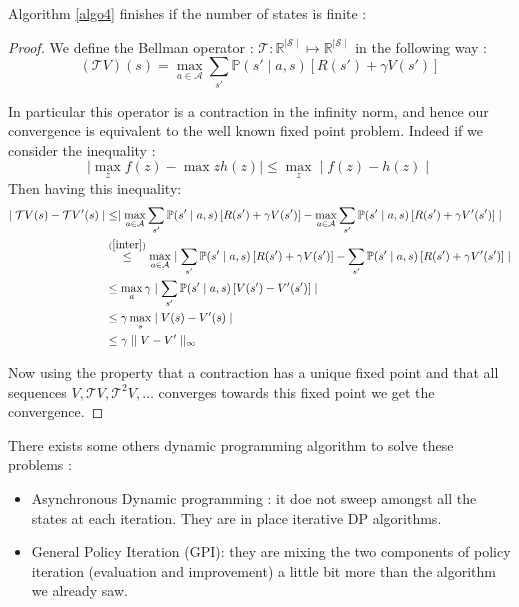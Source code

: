 \documentclass[14pt,a4paper]{article}
\theoremstyle{definition}
\begin{document}
Algorithm \ref{algo4} finishes if the number of states is finite : 
\begin{proof} 
We define the Bellman operator : $\mathcal{T}:\mathbb{R}^{\mid \mathcal{S}\mid } \mapsto \mathbb{R}^{\mid \mathcal{S}\mid }$ in the following way :
\begin{equation*}
(\mathcal{T}V)(s)=\max_{a \in \mathcal{A}}\sum_{s'}\mathbb{P}(s'\mid a,s)\left[ R(s') + \gamma V(s') \right]
\end{equation*}

In particular this operator is a contraction in the infinity norm, and hence our convergence is equivalent to the well known fixed point problem. Indeed if we consider the inequality : 
\begin{equation}
\mid \max_{z}f(z)-\max{z}h(z)\mid \leq \max_{z}\mid f(z) - h(z)\mid
\label{inter}
\end{equation}
Then having this inequality:
\begin{equation*}
\begin{split}
\mid \mathcal{T}V(s) - \mathcal{T}V'(s) \mid & \leq \mid \max_{a \in \mathcal{A}}\sum_{s'}\mathbb{P}(s'\mid a,s)\left[ R(s') + \gamma V(s') \right] - \max_{a \in \mathcal{A}}\sum_{s'}\mathbb{P}(s'\mid a,s)\left[ R(s') + \gamma V'(s') \right]\mid
\\& \stackrel{(\ref{inter})}{\leq} \max_{a \in \mathcal{A}}\mid \sum_{s'}\mathbb{P}(s'\mid a,s)\left[ R(s') + \gamma V(s') \right] - \sum_{s'}\mathbb{P}(s'\mid a,s)\left[ R(s') + \gamma V'(s') \right]\mid
\\&\leq \max _{a}\gamma \mid \sum_{s'}\mathbb{P}(s'\mid a,s)\left[ V(s')-V'(s')\right] \mid
\\& \leq \gamma \max_{s} \mid V(s)-V'(s) \mid
\\& \leq \gamma \mid \mid V-V'\mid \mid _{\infty}
\end{split}
\end{equation*}

Now using the property that a contraction has a unique fixed point and that all sequences $V,\mathcal{T}V,\mathcal{T}^2V,\ldots $ converges towards this fixed point we get the convergence.


\end{proof}





There exists some others dynamic programming algorithm to solve these problems : 
\begin{itemize}
\item Asynchronous Dynamic programming : it doe not sweep amongst all the states at each iteration. They are in place iterative DP algorithms.
\item General Policy Iteration (GPI): they are mixing the two components of policy iteration (evaluation and improvement) a little bit more than the algorithm we already saw.
\end{itemize}
\end{document}
